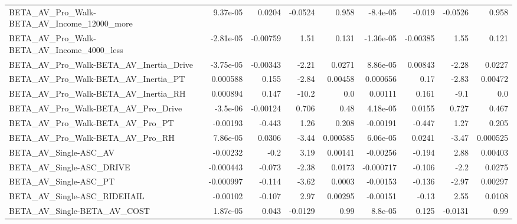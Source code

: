\begin{tabular}{lrrrrrrrr}
BETA\_AV\_Pro\_Walk-BETA\_AV\_Income\_12000\_more         &    9.37e-05 &       0.0204 &  -0.0524 &    0.958 &   -8.4e-05 &      -0.019 &      -0.0526 &         0.958 \\
BETA\_AV\_Pro\_Walk-BETA\_AV\_Income\_4000\_less          &   -2.81e-05 &     -0.00759 &     1.51 &    0.131 &  -1.36e-05 &    -0.00385 &         1.55 &         0.121 \\
BETA\_AV\_Pro\_Walk-BETA\_AV\_Inertia\_Drive             &   -3.75e-05 &     -0.00343 &    -2.21 &   0.0271 &   8.86e-05 &     0.00843 &        -2.28 &        0.0227 \\
BETA\_AV\_Pro\_Walk-BETA\_AV\_Inertia\_PT                &    0.000588 &        0.155 &    -2.84 &  0.00458 &   0.000656 &        0.17 &        -2.83 &       0.00472 \\
BETA\_AV\_Pro\_Walk-BETA\_AV\_Inertia\_RH                &    0.000894 &        0.147 &    -10.2 &      0.0 &    0.00111 &       0.161 &         -9.1 &           0.0 \\
BETA\_AV\_Pro\_Walk-BETA\_AV\_Pro\_Drive                 &    -3.5e-06 &     -0.00124 &    0.706 &     0.48 &   4.18e-05 &      0.0155 &        0.727 &         0.467 \\
BETA\_AV\_Pro\_Walk-BETA\_AV\_Pro\_PT                    &    -0.00193 &       -0.443 &     1.26 &    0.208 &   -0.00191 &      -0.447 &         1.27 &         0.205 \\
BETA\_AV\_Pro\_Walk-BETA\_AV\_Pro\_RH                    &    7.86e-05 &       0.0306 &    -3.44 & 0.000585 &   6.06e-05 &      0.0241 &        -3.47 &      0.000525 \\
BETA\_AV\_Single-ASC\_AV                              &    -0.00232 &         -0.2 &     3.19 &  0.00141 &   -0.00256 &      -0.194 &         2.88 &       0.00403 \\
BETA\_AV\_Single-ASC\_DRIVE                           &   -0.000443 &       -0.073 &    -2.38 &   0.0173 &  -0.000717 &      -0.106 &         -2.2 &        0.0275 \\
BETA\_AV\_Single-ASC\_PT                              &   -0.000997 &       -0.114 &    -3.62 &   0.0003 &   -0.00153 &      -0.136 &        -2.97 &       0.00297 \\
BETA\_AV\_Single-ASC\_RIDEHAIL                        &    -0.00102 &       -0.107 &     2.97 &  0.00295 &   -0.00151 &       -0.13 &         2.55 &        0.0108 \\
BETA\_AV\_Single-BETA\_AV\_COST                        &    1.87e-05 &        0.043 &  -0.0129 &     0.99 &    8.8e-05 &       0.125 &      -0.0131 &          0.99 \\

\end{tabular}
